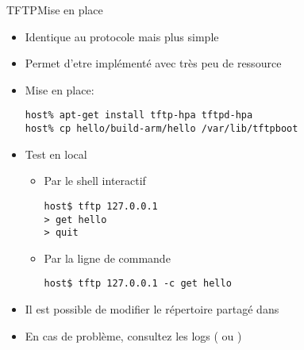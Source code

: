 \begin{frame}[fragile=singleslide]{TFTP}{Mise en place}
  \begin{itemize}
  \item Identique au protocole  mais plus simple
  \item Permet d'etre implémenté avec très peu de ressource
  \item Mise en place:
    \begin{lstlisting}
host% apt-get install tftp-hpa tftpd-hpa
host% cp hello/build-arm/hello /var/lib/tftpboot
    \end{lstlisting}
  \item Test en local
    \begin{itemize}
    \item Par le shell interactif
      \begin{lstlisting}
host$ tftp 127.0.0.1
> get hello
> quit
      \end{lstlisting}
    \item Par la ligne de commande
      \begin{lstlisting}
host$ tftp 127.0.0.1 -c get hello
      \end{lstlisting} %
    \end{itemize}
  \item  Il  est  possible  de  modifier le  répertoire  partagé  dans
  \item En cas de  problème, consultez les logs (
    ou )
  \end{itemize}
\end{frame}  

